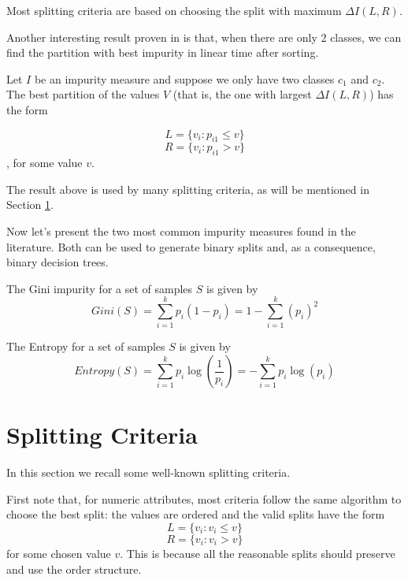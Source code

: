 Most splitting criteria are based on choosing the split with maximum $\Delta I(L, R)$.

Another interesting result proven in \cite{Breiman84} is that, when there are only 2 classes, we can find the partition with best impurity in linear time after sorting.

\begin{theorem}
\label{thm:two-class-trick}
Let $I$ be an impurity measure and suppose we only have two classes $c_1$ and $c_2$. The best partition of the values $V$ (that is, the one with largest $\Delta I(L, R)$) has the form

$$L = \{v_i : p_{i1} \leq v\}$$
$$R = \{v_i : p_{i1} > v\}$$,
for some value $v$.
\end{theorem}

The result above is used by many splitting criteria, as will be mentioned in Section \ref{sec:splitting-criteria}.

Now let's present the two most common impurity measures found in the literature. Both can be used to generate binary splits and, as a consequence, binary decision trees.

\begin{definition}
\label{def:Gini}
The Gini impurity for a set of samples $S$ is given by 
\begin{equation}
 Gini(S) =  \sum_{i=1}^k p_i(1 - p_i) = 1 - \sum_{i=1}^k (p_i)^2
\label{eq:gini}
\end{equation}
\end{definition}

\begin{definition}
The Entropy for a set of samples $S$ is given by 
\begin{equation}
 Entropy(S) = \sum_{i=1}^k p_i \log\left(\frac{1}{p_i}\right)  = - \sum_{i=1}^k p_i \log(p_i)
\label{eq:entropy}
\end{equation}
\end{definition}

\section{Splitting Criteria}
\label{sec:splitting-criteria}
In this section we recall some well-known splitting criteria.

First note that, for numeric attributes, most criteria follow the same algorithm to choose the best split: the values are ordered and the valid splits have the form 
$$L = \{v_i : v_i \leq v\}$$
$$R = \{v_i : v_i > v\}$$
for some chosen value $v$. This is because all the reasonable splits should preserve and use the order structure.

